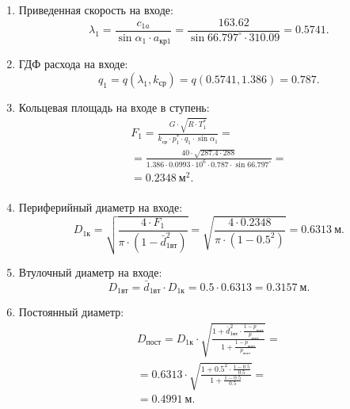 \documentclass[a4paper,10pt]{article}
\begin{document}
\begin{enumerate}
        \item Приведенная скорость на входе:
        \[
            \lambda_1 = \frac{ c_{1a} }{ \sin{\alpha_1} \cdot a_{кр1} } = 
            \frac{ 163.62 }{ \sin{66.797^\circ} \cdot 310.09 } = 
            0.5741.
        \]

        \item ГДФ расхода на входе:
        \[
            q_1 = q(\lambda_1, k_{ср}) = q(0.5741, 1.386) = 
            0.787.
        \]

        \item Кольцевая площадь на входе в ступень:
        \begin{gather*}
            F_1 = \frac{ G \cdot \sqrt{R \cdot T_1^*} }{ k_{ср} \cdot p_1^* \cdot q_1 \cdot \sin{\alpha_1} } =\\
            =\frac{ 
                40 \cdot \sqrt{ 287.4 \cdot 288}
            }{ 
                1.386 \cdot 0.0993 \cdot 10^6 \cdot 0.787 
                \cdot \sin{66.797^\circ} 
            } =\\
            =0.2348\ м^2.\\
        \end{gather*}

        \item Периферийный диаметр на входе:
        \[
            D_{1к} = \sqrt{ \frac{ 4 \cdot F_1 }{ \pi \cdot (1 - \bar{d}_{1вт}^2) } } = 
            \sqrt{ \frac{ 
                    4 \cdot 0.2348 
                }{ 
                    \pi \cdot (1 - 0.5^2) 
            } } = 
            0.6313\ м.
        \]

        \item Втулочный диаметр на входе:
        \[
            D_{1вт} = \bar{d}_{1вт} \cdot D_{1к} = 
            0.5 \cdot 0.6313 = 
            0.3157\ м.
        \]

        \item Постоянный диаметр:
        \begin{gather*}
            D_{пост} = D_{1к} \cdot 
                \sqrt{ \frac{ 
                        1 + \bar{d}_{1вт}^2 \cdot \frac{ 1 - p_{пост} }{ p_{пост} }  
                    }{
                        1 + \frac{ 1 - p_{пост} }{ p_{пост}}
                } } =\\
            =0.6313 \cdot 
                \sqrt{ \frac{ 
                        1 + 0.5^2 \cdot 
                        \frac{ 1 - 0.5 }{ 0.5 }  
                    }{
                        1 + \frac{ 1 - 0.5 }{ 0.5}
                } } =\\
                =0.4991\ м.\\  
        \end{gather*}


\end{enumerate}
\end{document}

